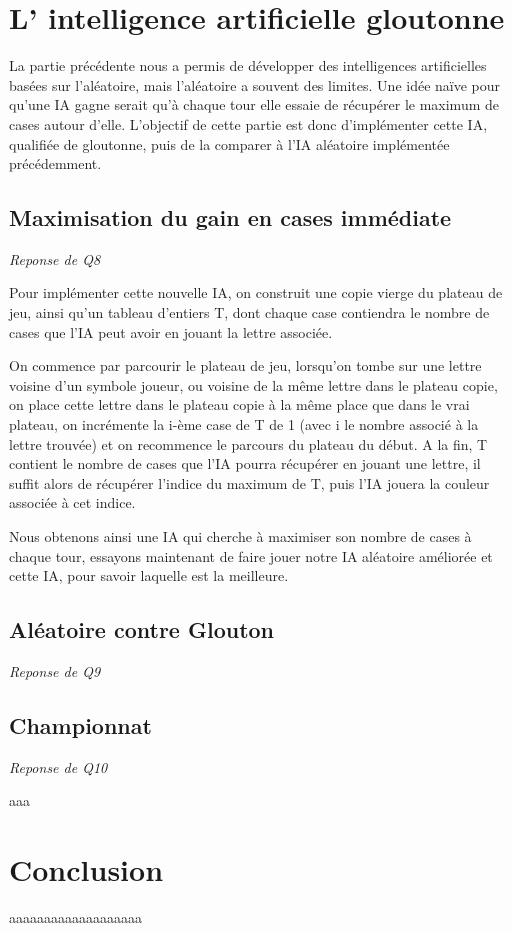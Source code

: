 \documentclass[a4paper,11pt]{article}
\begin{document}
\section{L' intelligence artificielle gloutonne}

La partie précédente nous a permis de développer des intelligences artificielles
basées sur l'aléatoire, mais l'aléatoire a souvent des limites. Une idée naïve pour
qu'une IA gagne serait qu'à chaque tour elle essaie de récupérer le maximum de cases
autour d'elle. L'objectif de cette partie est donc d'implémenter cette IA, qualifiée 
de gloutonne, puis de la comparer à l'IA aléatoire implémentée précédemment.


\subsection{Maximisation du gain en cases immédiate}
\emph{Reponse de Q8}

Pour implémenter cette nouvelle IA, on construit une copie vierge du plateau de jeu,
ainsi qu'un tableau d'entiers T, dont chaque case contiendra le nombre de cases que l'IA peut
avoir en jouant la lettre associée. 

On commence par parcourir le plateau de jeu, lorsqu'on tombe sur une lettre voisine
d'un symbole joueur, ou voisine de la même lettre dans le plateau copie, on place cette
lettre dans le plateau copie à la même place que dans le vrai plateau, on incrémente
la i-ème case de T de 1 (avec i le nombre associé à la lettre trouvée) et on 
recommence le parcours du plateau du début. A la fin, T contient le nombre de cases
que l'IA pourra récupérer en jouant une lettre, il suffit alors de récupérer l'indice
du maximum de T, puis l'IA jouera la couleur associée à cet indice. 

Nous obtenons ainsi une IA qui cherche à maximiser son nombre de cases à chaque tour,
essayons maintenant de faire jouer notre IA aléatoire améliorée et cette IA, pour
savoir laquelle est la meilleure.

\subsection{Aléatoire contre Glouton}
\emph{Reponse de Q9}



\subsection{Championnat}
\emph{Reponse de Q10}

aaa

\section{Conclusion}

aaaaaaaaaaaaaaaaaaa
\end{document}
